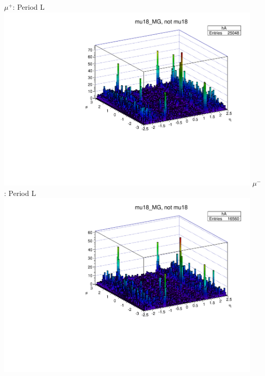  {
\colb[T]
$\mu^+$: Period L
\centering
\includegraphics[width=0.95\textwidth]{dates/20130306/figures/mu18/dump_MG_dataL_w_POS.dat__MG_NOT_MUID}
$\mu^-$: Period L
\centering
\includegraphics[width=0.95\textwidth]{dates/20130306/figures/mu18/dump_MG_dataL_w_NEG.dat__MG_NOT_MUID}
\cole
}
